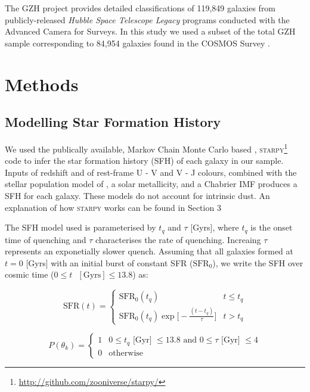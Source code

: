 \documentclass[a4paper,fleqn,usenatbib]{mnras}
\begin{document}
   The GZH project provides detailed classifications of 119,849 galaxies from publicly-released \textit{Hubble
   Space Telescope Legacy} programs conducted with the Advanced Camera for Surveys. In this study we used a subset of the total GZH sample corresponding to 84,954
   galaxies found in the COSMOS Survey \citep{scoville2007,koekemoer2007}.

\section{Methods}   

   \subsection{Modelling Star Formation History}

   We used the publically available, Markov Chain Monte Carlo based \citep{mackey2013},
   \textsc{starpy}\footnote{\url{http://github.com/zooniverse/starpy/}} code to infer the star formation 
   history (SFH) of each galaxy in our sample. Inputs of redshift and of rest-frame U - V and V - J colours, 
   combined with the stellar population model of \cite{bruzual2003}, a solar metallicity, and a Chabrier IMF 
   \cite{chabrier2003} produces a SFH for each galaxy. These models do not account for intrinsic dust. An 
   explanation of how \textsc{starpy} works can be found in Section 3

   The SFH model used is parameterised by $t_{q}$ and $\tau$ [Gyrs], where $t_{q}$ is the onset time of quenching
   and $\tau$ characterises the rate of quenching. Increaing $\tau$ represents an exponetially slower quench. 
   Assuming that all galaxies formed at $t=0$ [Gyrs] with an initial burst of constant SFR ($\text{SFR}_{0}$), 
   we write the SFH over cosmic time ($0\leq t \text{ }[\text{Gyrs}]\leq 13.8$) as:

 \begin{equation}
       \text{SFR}(t) = \begin{cases}
                 \text{SFR}_{0}(t_{q}) & t \leq t_{q} \\
                 \text{SFR}_{0}(t_{q})\exp\bigg[-\frac{(t-t_{q})}{\tau}\bigg] & t > t_{q} 
                \end{cases}
        \label{eq:model}
 \end{equation}

   

   \begin{equation}
      P(\theta_{k}) = \begin{cases}
                       1 & 0\leq t_{q}\text{ [Gyr] } \leq 13.8 \text{ and }  0 \leq \tau\text{ [Gyr] } \leq 4 \\
                       0 & \text{otherwise}
                      \end{cases}
      \label{eq:prior}
   \end{equation}
\end{document}
